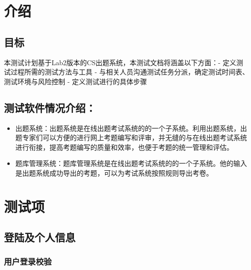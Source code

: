 \documentclass[hyperref, a4paper]{ctexart}
\providecommand{\tightlist}{%
  \setlength{\itemsep}{0pt}\setlength{\parskip}{0pt}}
\begin{document}
\hypertarget{ux4ecbux7ecd}{%
\section{介绍}\label{ux4ecbux7ecd}}

\hypertarget{ux76eeux6807}{%
\subsection{目标}\label{ux76eeux6807}}

本测试计划基于Lab2版本的CS出题系统，本测试文档将涵盖以下方面：\newline -
定义测试过程所需的测试方法与工具 -
与相关人员沟通测试任务分派，确定测试时间表、测试环境与风险控制 -
定义测试进行的具体步骤

\hypertarget{ux6d4bux8bd5ux8f6fux4ef6ux60c5ux51b5ux4ecbux7ecd}{%
\subsection{测试软件情况介绍：}\label{ux6d4bux8bd5ux8f6fux4ef6ux60c5ux51b5ux4ecbux7ecd}}

\begin{itemize}
\tightlist
\item
  出题系统：出题系统是在线出题考试系统的的⼀个⼦系统。利⽤出题系统，出题专家们可以⽅便的进⾏⽹上考题编写和评审，并⽆缝的与在线出题考试系统进⾏衔接，提⾼考题编写的质量和效率，也便于考题的统⼀管理和评估。
\item
  题库管理系统：题库管理系统是在线出题考试系统的的⼀个⼦系统。他的输⼊是出题系统成功导出的考题，可以为考试系统按照规则导出考卷。
\end{itemize}

\hypertarget{ux6d4bux8bd5ux9879}{%
\section{测试项}\label{ux6d4bux8bd5ux9879}}

\hypertarget{ux767bux9646ux53caux4e2aux4ebaux4fe1ux606f}{%
\subsection{登陆及个人信息}\label{ux767bux9646ux53caux4e2aux4ebaux4fe1ux606f}}

\hypertarget{ux7528ux6237ux767bux5f55ux6821ux9a8c}{%
\subsubsection{用户登录校验}\label{ux7528ux6237ux767bux5f55ux6821ux9a8c}}
\end{document}
